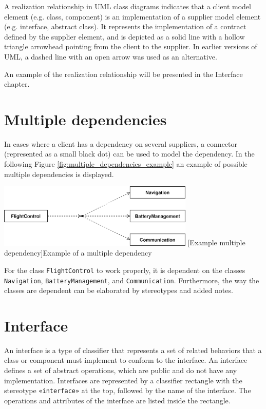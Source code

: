 \documentclass[
	12pt,
    a4paper,
    egregdoesnotlikesansseriftitles, %
    toc=chapterentrywithdots,
    oneside, openany,
    titlepage,
    parskip=half,
    headings=normal,  %
    listof=totoc,
    bibliography=totocnumbered,
    index=totoc,
    captions=tableheading,  %
    listof=flat,
    numbers=noenddot, %
    final]
    {scrbook}
\begin{document}
A realization relationship in UML class diagrams indicates that a client model element (e.g. class, component) is an implementation of a supplier model element (e.g. interface, abstract class). 
It represents the implementation of a contract defined by the supplier element, and is depicted as a solid line with a hollow triangle arrowhead pointing from the client to the supplier.
In earlier versions of UML, a dashed line with an open arrow was used as an alternative. 

An example of the realization relationship will be presented in the Interface chapter.


\section{Multiple dependencies}
In cases where a client has a dependency on several suppliers, a connector (represented as a small black dot) can be used to model the dependency.  \cite[p. 160]{uml}
In the following Figure \ref{fig:multiple_dependencies_example} an example of possible multiple dependencies is displayed.

\vspace{1em}
\begin{minipage}{\linewidth}
	\centering
	\includegraphics[width=0.7\textwidth]{figures/dependencies/multiple_dependencies.jpg}
	[Example multiple dependency]{Example of a multiple dependency}
	\label{fig:multiple_dependencies_example}
\end{minipage}

For the class \texttt{FlightControl} to work properly, it is dependent on the classes \texttt{Navigation}, \texttt{BatteryManagement}, and \texttt{Communication}.
Furthermore, the way the classes are dependent can be elaborated by stereotypes and added notes.

\section{Interface}

An interface is a type of classifier that represents a set of related behaviors that a class or component must implement to conform to the interface. 
An interface defines a set of abstract operations, which are public and do not have any implementation.
Interfaces are represented by a classifier rectangle with the stereotype \texttt{«interface»} at the top, followed by the name of the interface. 
The operations and attributes of the interface are listed inside the rectangle. \cite[p. 130-131]{uml}
\end{document}
